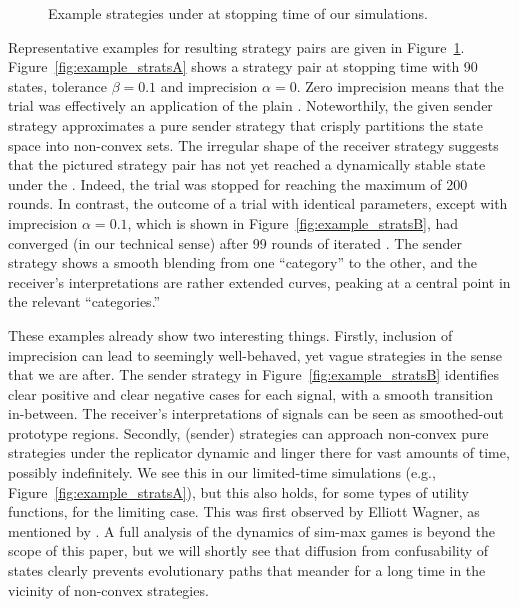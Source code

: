 \documentclass[fleqn,reqno,10pt]{article}
\newcommand{\rd}{\acro{rd}} %
\newcommand{\rdd}{\acro{rdd}} %
\newcommand{\imprecision}{\ensuremath{\alpha}} %
\newcommand{\toler}{\ensuremath{\beta}} %
\newcommand{\ns}{\ensuremath{n_s}} %
\begin{document}
\begin{figure}


  \caption{Example strategies under \rdd at stopping time of our simulations.}
  \label{fig:example_strats}
\end{figure}

Representative examples for resulting strategy pairs are given in
Figure~\ref{fig:example_strats}. Figure~\ref{fig:example_stratsA} shows a strategy pair at
stopping time with 90 states, tolerance $\toler = 0.1$ and imprecision $\imprecision = 0$. Zero
imprecision means that the trial was effectively an application of the plain \rd. Noteworthily,
the given sender strategy approximates a pure sender strategy that crisply partitions the state
space into non-convex sets. The irregular shape of the receiver strategy suggests that the
pictured strategy pair has not yet reached a dynamically stable state under the \rd. Indeed,
the trial was stopped for reaching the maximum of 200 rounds. In contrast, the outcome of a
trial with identical parameters, except with imprecision $\imprecision = 0.1$, which is shown
in Figure~\ref{fig:example_stratsB}, had converged (in our technical sense) after 99 rounds of
iterated \rdd. The sender strategy shows a smooth blending from one ``category'' to the other,
and the receiver's interpretations are rather extended curves, peaking at a central point in
the relevant ``categories.''

These examples already show two interesting things. Firstly, inclusion of imprecision can lead
to seemingly well-behaved, yet vague strategies in the sense that we are after. The sender
strategy in Figure~\ref{fig:example_stratsB} identifies clear positive and clear negative cases
for each signal, with a smooth transition in-between. The receiver's interpretations of signals
can be seen as smoothed-out prototype regions. Secondly, (sender) strategies can approach
non-convex pure strategies under the replicator dynamic and linger there for vast amounts of
time, possibly indefinitely. We see this in our limited-time simulations (e.g.,
Figure~\ref{fig:example_stratsA}), but this also holds, for some types of utility functions,
for the limiting case. This was first observed by Elliott Wagner, as mentioned by
\citet{OConnor2014-OCOEPC}.  A full analysis of the dynamics of sim-max games is beyond the
scope of this paper, but we will shortly see that diffusion from confusability of states
clearly prevents evolutionary paths that meander for a long time in the vicinity of non-convex
strategies.
\end{document}

